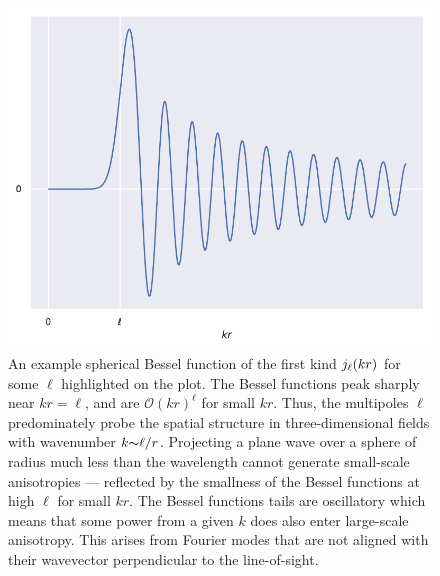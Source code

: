 \begin{figure}[htpb]
	\centering\capstart{}
	\includegraphics[width=\textwidth]{spherical_bessel.pdf}
	\caption[
		An example spherical Bessel function of the first kind
	]{
		An example spherical Bessel function of the first kind \(j_{\ell}(kr)\) for some \(\ell{}\) highlighted on the plot.
		The Bessel functions peak sharply near \(k r = \ell{}\), and are \(\mathcal{O}{(k r)}^{\ell}\) for small \(k r\).
		Thus, the multipoles \(\ell{}\) predominately probe the spatial structure in three-dimensional fields with wavenumber \(k {\thicksim}\ell/r\).
		Projecting a plane wave over a sphere of radius much less than the wavelength cannot generate small-scale anisotropies --- reflected by the smallness of the Bessel functions at high \(\ell{}\) for small \(k r\).
		The Bessel functions tails are oscillatory which means that some power from a given \(k\) does also enter large-scale anisotropy.
		This arises from Fourier modes that are not aligned with their wavevector perpendicular to the line-of-sight.
	}\label{fig:chapter2_spherical_bessel}
\end{figure}
